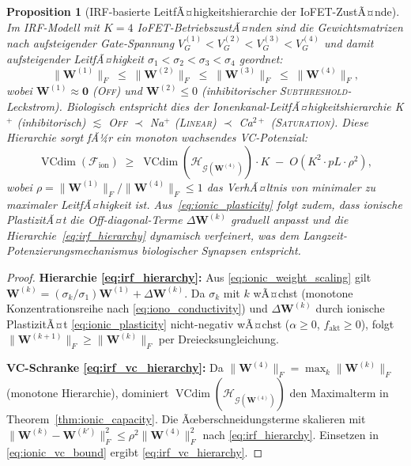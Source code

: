 ﻿\documentclass[12pt, a4paper, openany]{report}
\newtheorem{proposition}[theorem]{Proposition}
\newcommand{\calG}{\mathcal{G}}
\newcommand{\calH}{\mathcal{H}}
\newcommand{\calF}{\mathcal{F}}
\DeclareMathOperator{\VC}{VCdim}
\begin{document}
\begin{proposition}[IRF-basierte LeitfÃ¤higkeitshierarchie der IoFET-ZustÃ¤nde]
\label{prop:ionic_hierarchy}
Im IRF-Modell mit $K=4$ IoFET-BetriebszustÃ¤nden sind die Gewichtsmatrizen
nach aufsteigender Gate-Spannung $V_G^{(1)} < V_G^{(2)} < V_G^{(3)} < V_G^{(4)}$
und damit aufsteigender LeitfÃ¤higkeit $\sigma_1 < \sigma_2 < \sigma_3 < \sigma_4$
geordnet:
\begin{equation}
  \label{eq:irf_hierarchy}
  \|\bm{W}^{(1)}\|_F \;\leq\; \|\bm{W}^{(2)}\|_F \;\leq\;
  \|\bm{W}^{(3)}\|_F \;\leq\; \|\bm{W}^{(4)}\|_F,
\end{equation}
wobei $\bm{W}^{(1)} \approx \bm{0}$ (\textsc{Off}) und $\bm{W}^{(2)} \leq 0$
(inhibitorischer \textsc{Subthreshold}-Leckstrom).  Biologisch entspricht
dies der Ionenkanal-LeitfÃ¤higkeitshierarchie
K$^+$ (inhibitorisch) $\lesssim$ \textsc{Off} $\prec$ Na$^+$ (\textsc{Linear})
$\prec$ Ca$^{2+}$ (\textsc{Saturation}).
Diese Hierarchie sorgt fÃ¼r ein monoton wachsendes VC-Potenzial:
\begin{equation}
  \label{eq:irf_vc_hierarchy}
  \VC(\calF_{\mathrm{ion}}) \;\geq\; \VC(\calH_{\calG(\bm{W}^{(4)})}) \cdot K
  \;-\; O(K^2 \cdot p L \cdot \rho^2),
\end{equation}
wobei $\rho = \|\bm{W}^{(1)}\|_F / \|\bm{W}^{(4)}\|_F \leq 1$ das
VerhÃ¤ltnis von minimaler zu maximaler LeitfÃ¤higkeit ist.
Aus~\eqref{eq:ionic_plasticity} folgt zudem, dass ionische PlastizitÃ¤t
die Off-diagonal-Terme $\Delta\bm{W}^{(k)}$ graduell anpasst und die
Hierarchie~\eqref{eq:irf_hierarchy} dynamisch verfeinert, was dem
Langzeit-Potenzierungsmechanismus biologischer Synapsen entspricht.
\end{proposition}

\begin{proof}
\textbf{Hierarchie \eqref{eq:irf_hierarchy}:}
Aus \eqref{eq:ionic_weight_scaling} gilt $\bm{W}^{(k)} = (\sigma_k/\sigma_1)
\bm{W}^{(1)} + \Delta\bm{W}^{(k)}$.  Da $\sigma_k$ mit $k$ wÃ¤chst
(monotone Konzentrationsreihe nach \eqref{eq:iono_conductivity}) und
$\Delta\bm{W}^{(k)}$ durch ionische PlastizitÃ¤t \eqref{eq:ionic_plasticity}
nicht-negativ wÃ¤chst ($\alpha \geq 0$, $f_\mathrm{akt} \geq 0$), folgt
$\|\bm{W}^{(k+1)}\|_F \geq \|\bm{W}^{(k)}\|_F$ per Dreiecksungleichung.

\textbf{VC-Schranke \eqref{eq:irf_vc_hierarchy}:}
Da $\|\bm{W}^{(4)}\|_F = \max_k \|\bm{W}^{(k)}\|_F$ (monotone Hierarchie),
dominiert $\VC(\calH_{\calG(\bm{W}^{(4)})})$ den Maximalterm in
Theorem~\ref{thm:ionic_capacity}.  Die Ãœberschneidungsterme skalieren
mit $\|\bm{W}^{(k)} - \bm{W}^{(k')}\|_F^2 \leq \rho^2 \|\bm{W}^{(4)}\|_F^2$
nach \eqref{eq:irf_hierarchy}.  Einsetzen in
\eqref{eq:ionic_vc_bound} ergibt \eqref{eq:irf_vc_hierarchy}.
\end{proof}
\end{document}
